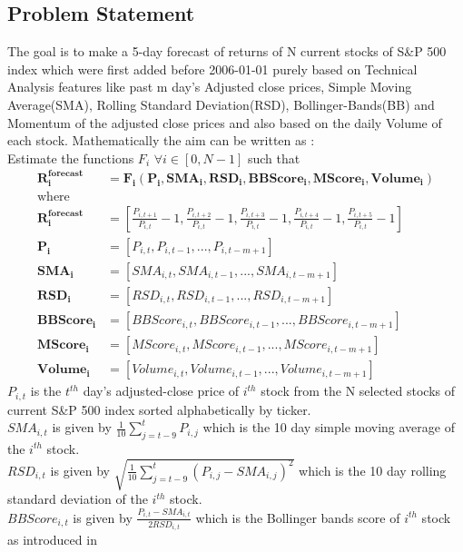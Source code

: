 \documentclass[10pt]{report}
\begin{document}
\subsection*{Problem Statement}
The goal is to make a 5-day forecast of returns of N current stocks of S\&P 500 index which were first added before 2006-01-01 purely based on Technical Analysis features like past m day’s Adjusted close prices, Simple Moving Average(SMA), Rolling Standard Deviation(RSD), Bollinger-Bands(BB)\cite{bollingerbands} and Momentum of the adjusted close prices and also based on the daily Volume of each stock. Mathematically the aim can be written as :\\
Estimate the functions $F_i$ $\forall i \in [0,N-1]$ such that\\
\begin{align*}
\bm{R^{forecast}_{i}} &= \bm{F_i}(\bm{P_i}, \bm{SMA_i}, \bm{RSD_i}, \bm{BBScore_i}, \bm{MScore_i},\bm{ Volume_i})\\
\text{where}\\
\bm{R^{forecast}_{i}} &= [ \frac{P_{i, t+1}}{P_{i, t}} - 1, \frac{P_{i, t+2}}{P_{i, t}} - 1, \frac{P_{i, t+3}}{P_{i, t}} - 1, \frac{P_{i, t+4}}{P_{i, t}} - 1, \frac{P_{i, t+5}}{P_{i, t}} - 1] \\
\bm{P_i} &= [ P_{i, t}, P_{i, t-1}, ..., P_{i, t-m+1} ] \\
\bm{SMA_i} &= [ SMA_{i, t}, SMA_{i, t-1}, ..., SMA_{i, t-m+1} ]\\
\bm{RSD_i} &= [ RSD_{i, t}, RSD_{i, t-1}, ..., RSD_{i, t-m+1} ]\\
\bm{BBScore_i} &= [ BBScore_{i, t}, BBScore_{i, t-1}, ..., BBScore_{i, t-m+1} ]\\
\bm{MScore_i} &= [ MScore_{i, t}, MScore_{i, t-1}, ..., MScore_{i, t-m+1} ]\\
\bm{Volume_i} &= [ Volume_{i, t}, Volume_{i, t-1}, ..., Volume_{i, t-m+1} ]
\end{align*}
$P_{i,t}$ is the $t^{th}$ day's adjusted-close\cite{adjclose} price of $i^{th}$ stock from the N selected stocks of current S\&P 500 index sorted alphabetically by ticker.\\
$SMA_{i,t}$ is given by $\frac{1}{10}\sum_{j=t-9}^{t} P_{i,j}$ which is the 10 day simple moving average of the $i^{th}$ stock.\\
$RSD_{i,t}$ is given by $\sqrt{\frac{1}{10}\sum_{j=t-9}^{t} \left( P_{i,j} - SMA_{i,j}\right)^2}$ which is the 10 day rolling standard deviation of the $i^{th}$ stock.\\
$BBScore_{i,t}$ is given by $\frac{P_{i,t} - SMA_{i,t}}{2 RSD_{i,t}}$ which is the Bollinger bands score of $i^{th}$ stock as introduced in \cite{mlfortrading} \\
\end{document}
